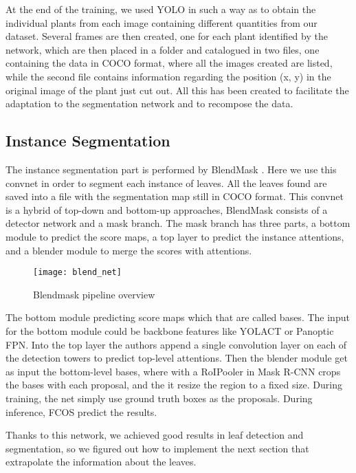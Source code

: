 At the end of the training, we used YOLO in such a way as to obtain the individual plants from each image containing different quantities from our dataset. Several
frames are then created, one for each plant identified by the network, which are then placed in a folder and catalogued in two files, one containing the data in COCO
\cite{lin2014microsoft} format, where all the images created are listed, while the second file contains information regarding the position (x, y) in the original image
of the plant just cut out. All this has been created to facilitate the adaptation to the segmentation network and to recompose the data.


\subsection{Instance Segmentation}
The instance segmentation part is performed by BlendMask \cite{chen2020blendmask}. Here we use this convnet in order to segment each instance of leaves. All the leaves found
are saved into a file with the segmentation map still in COCO format. This convnet is a hybrid of top-down and bottom-up approaches, BlendMask consists of a detector
network and a mask branch. The mask branch has three parts, a bottom module to predict the score maps, a top layer to predict the instance
attentions, and a blender module to merge the scores with attentions. 

\begin{figure}[h]
    \centering
    \texttt{[image: blend\_net]} 
    \caption{Blendmask pipeline overview}
\end{figure}

The bottom module predicting score maps which that are called bases. The input for the bottom module could be backbone features like YOLACT or Panoptic FPN. 
Into the top layer the authors append a single convolution layer on each of the detection towers to predict top-level attentions. Then the blender module get as input the 
bottom-level bases, where with a RoIPooler in Mask R-CNN crops the bases with each proposal, and the it resize the region to a fixed size.
During training, the net simply use ground truth boxes as the proposals. During inference, FCOS \cite{tian2019fcos} predict the results. 

Thanks to this network, we achieved good results in leaf detection and segmentation, so we figured out how to implement the next section that extrapolate the information about
the leaves. 




